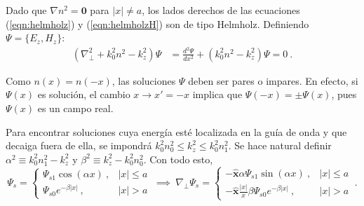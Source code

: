 Dado que $\nabla n^2 = \textbf{0}$ para $|x| \neq a$, los lados derechos de las ecuaciones (\ref{eqn:helmholz}) y (\ref{eqn:helmholzH}) son de tipo Helmholz. Definiendo $\Psi = \{E_z, H_z\} $:
\begin{align*}
	(\nabla_\perp^2  + k_0^2n^2 - k_z^2) \Psi  &=  \frac{d^2\Psi}{dx^2} + (k_0^2n^2 - k_z^2) \Psi  = 0 \ .
\end{align*}

Como $n(x)=n(-x)$, las soluciones $\Psi$ deben ser pares o impares. En efecto, si $\Psi(x)$ es solución, el cambio $x\to x'=-x$ implica que $\Psi(-x)=\pm \Psi(x)$, pues $\Psi(x)$ es un campo real.

Para encontrar soluciones cuya energía esté localizada en la guía de onda y que decaiga fuera de ella, se impondrá $k_0^2n_0^2 \le k_z^2 \le k_0^2n_1^2$. Se hace natural definir $\alpha^2\equiv k_0^2n_1^2-k_z^2$ y $\beta^2\equiv k_z^2 - k_0^2n_0^2$. Con todo esto, 
\begin{equation*}
	\Psi_s = \left\{\begin{matrix}
	\Psi_{s1}\cos(\alpha x) \ , & |x|\le a
	\\
	\Psi_{s0}e^{-\beta|x|} \ , & |x|>a
	\end{matrix}\right.
	\
	\implies 	
	\	
	\nabla_\perp \Psi_s = \left\{\begin{matrix}
	-\hat{\textbf{x}}\alpha\Psi_{s1}\sin(\alpha x) \ , & |x|\le a
	\\
	-\hat{\textbf{x}}\frac{|x|}{x}\beta\Psi_{s0}e^{-\beta|x|} \ , & |x|>a
	\end{matrix}\right.
	\
	.
\end{equation*}

